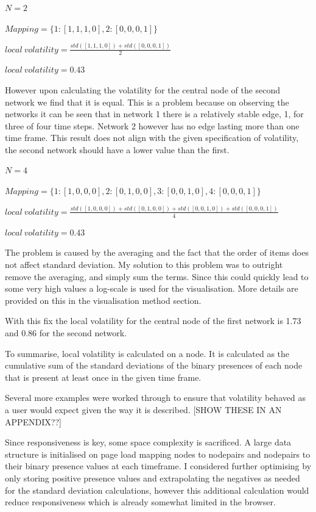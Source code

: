 \begin{center}
$N = 2$

$Mapping = \{1:[1, 1, 1, 0], 2:[0, 0, 0, 1]\}$

$local\ volatility = \frac{std([1,1,1,0]) + std([0,0,0,1])}{2}$

$local\ volatility = 0.43$
\end{center}

However upon calculating the volatility for the central node of the second network we find that it is equal. This is a problem because on observing the networks it can be seen that in network 1 there is a relatively stable edge, 1, for three of four time steps. Network 2 however has no edge lasting more than one time frame. This result does not align with the given specification of volatility, the second network should have a lower value than the first.

\begin{center}
$N = 4$

$Mapping = \{1:[1, 0, 0, 0], 2:[0, 1, 0, 0], 3: [0, 0, 1, 0], 4: [0, 0, 0, 1]\}$

$local\ volatility = \frac{std([1,0,0,0]) + std([0,1,0,0]) + std([0,0,1,0]) + std([0,0,0,1])}{4}$

$local\ volatility = 0.43$
\end{center}

The problem is caused by the averaging and the fact that the order of items does not affect standard deviation. My solution to this problem was to outright remove the averaging, and simply sum the terms. Since this could quickly lead to some very high values a log-scale is used for the visualisation. More details are provided on this in the visualisation method section.  

With this fix the local volatility for the central node of the first network is 1.73 and 0.86 for the second network. 

To summarise, local volatility is calculated on a node. It is calculated as the cumulative sum of the standard deviations of the binary presences of each node that is present at least once in the given time frame.

Several more examples were worked through to ensure that volatility behaved as a user would expect given the way it is described. [SHOW THESE IN AN APPENDIX??]

Since responsiveness is key, some space complexity is sacrificed. A large data structure is initialised on page load mapping nodes to nodepairs and nodepairs to their binary presence values at each timeframe.
I considered further optimising by only storing positive presence values and extrapolating the negatives as needed for the standard deviation calculations, however this additional calculation would reduce responsiveness which is already somewhat limited in the browser.


